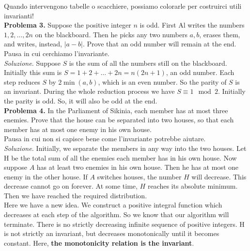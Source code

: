 \documentclass[a4paper]{article}
\theoremstyle{remark}
\theoremstyle{definition}
\begin{document}
\begin{multicols}{2}
	\textsf{Quando intervengono tabelle o scacchiere, possiamo colorarle per costruirci utili invarianti!}\\
	
	\textbf{Problema 3.} Suppose the positive integer $ n $ is odd. First Al writes the numbers $ 1, 2,\dots, 2n $
	on the blackboard. Then he picks any two numbers $ a, b $, erases them, and writes,
	instead, $ |a - b| $. Prove that an odd number will remain at the end. \\
	
	\textsf{Pausa in cui cerchiamo l'invariante.} \\
	
	\textit{Soluzione.} Suppose $ S $ is the sum of all the numbers still on the blackboard. Initially
	this sum is $ S = 1+2+ \dots +2n = n(2n+1) $, an odd number. Each step reduces $ S $
	by $ 2 \min(a, b) $, which is an even number. So the parity of $ S $ is an invariant. During
	the whole reduction process we have $ S \equiv 1 \mod 2 $. Initially the parity is odd. So,
	it will also be odd at the end. \\
	
	\textbf{Problema 4.} In the Parliament of Sikinia, each member has at most three enemies. Prove
	that the house can be separated into two houses, so that each member has at most
	one enemy in his own house. \\
	
	\textsf{Pausa in cui non si capisce bene come l'invariante potrebbe aiutare.} \\
	
	\textit{Soluzione.} Initially, we separate the members in any way into the two houses. Let
	H be the total sum of all the enemies each member has in his own house. Now
	suppose $ A $ has at least two enemies in his own house. Then he has at most one
	enemy in the other house. If $ A $ switches houses, the number $ H $ will decrease. This
	decrease cannot go on forever. At some time, $ H $ reaches its absolute minimum.
	Then we have reached the required distribution.\\
	
	\textsf{Here we have a new idea. We construct a positive integral function which decreases
	at each step of the algorithm. So we know that our algorithm will terminate.
	There is no strictly decreasing infinite sequence of positive integers. H is not
	strictly an invariant, but decreases monotonically until it becomes constant. Here,
	\textbf{the monotonicity relation is the invariant}.} \\
	
\end{multicols}
\end{document}
